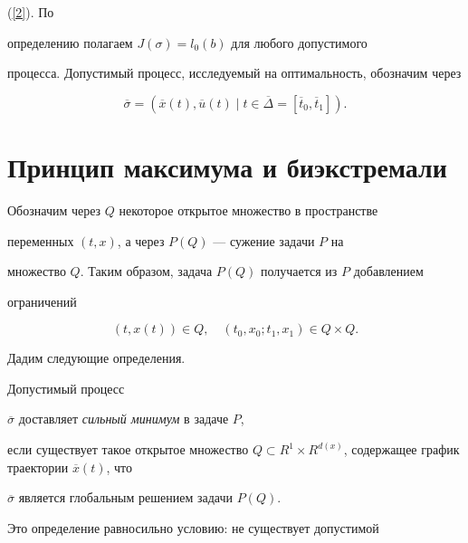 (\ref{2}). По


определению полагаем $J(\sigma)=l_0 (b)$ для любого допустимого


процесса. Допустимый процесс, исследуемый на оптимальность, обозначим через


$$


\overline{\sigma}=(\overline{x}(t),


\overline{u}(t)\mid t\in\overline{\Delta}=\left[\overline{t}_0,


\overline{t}_1 \right] ).


$$





\section{Принцип максимума и биэкстремали}





Обозначим через $Q$ некоторое открытое множество в пространстве


переменных $(t,x)$, а через $P(Q)$ --- сужение задачи $P$ на


множество $Q$. Таким образом, задача $P(Q)$ получается из $P$ добавлением


ограничений


$$


(t, x(t))\in Q,\quad (t_0,x_0; t_1, x_1)\in Q\times Q.


$$





Дадим следующие определения.





\begin{defn}


Допустимый процесс


$\overline{\sigma}$ доставляет {\em сильный минимум} в задаче $P$,


если существует такое открытое множество $Q\subset R^1 \times


R^{d(x)}$, содержащее график траектории $\overline{x}(t)$, что


$\overline{\sigma}$ является глобальным решением задачи $P(Q)$.


\end{defn}





Это определение равносильно условию: не существует допустимой


